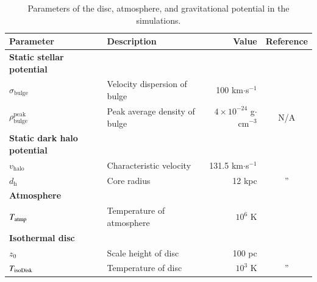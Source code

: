 \documentclass[twocolumn]{aastex631}
\begin{document}
\begin{table}[t]
\raggedright
\caption{Parameters of the disc, atmosphere, and gravitational potential in the simulations.}
\label{table-parameters}
\begin{tabular}{@{}llrc@{}}
\toprule[1pt]\midrule[0.3pt]
Parameter                             & Description                               & Value                                &  Reference                     \\ \midrule
{\bf Static stellar potential }       &                                           &                                      &                                \\
$\sigma_{\text{bulge}}$               & Velocity dispersion of bulge              & 100 km$\cdot$s$^{-1}$                & \citep{velocity-dispersion-MW} \\
$\rho_{\text{bulge}}^{\text{peak}}$   & Peak average density of bulge             & $4\times 10^{-24}$ g$\cdot$cm$^{-3}$ &   N/A                          \\ \hline
{\bf Static dark halo potential }     &                                           &                                      &                                \\
$v_{\text{halo}}$                     & Characteristic velocity                   & 131.5 km$\cdot$s$^{-1}$              & \citep{Johnston1995}           \\
$d_{\text{h}}$                        & Core radius                               & 12 kpc                               & \multicolumn{1}{c}{''}         \\ \hline
{\bf Atmosphere }                     &                                           &                                      &                                \\
$T_{\text{\text{atmp}}}$              & Temperature of atmosphere                 & $10^{6}$ K                           & \citep{temperature-MW}         \\ \hline
{\bf Isothermal disc }                &                                           &                                      &                                \\
$z_{0}$                               & Scale height of disc                      & 100 pc                               & \citep{peak-ism-density}       \\
$T_{\text{\text{isoDisk}}}$           & Temperature of disc                       & $10^{3}$ K                           & \multicolumn{1}{c}{''}         \\

\end{tabular}
\end{table}
\end{document}
